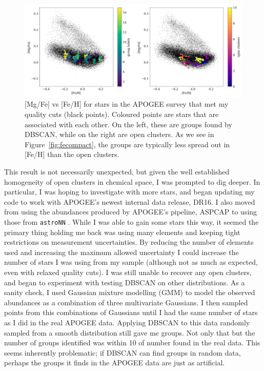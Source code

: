 \documentclass[11pt]{article}
\begin{document}
\begin{figure}
  \begin{center}
    \includegraphics[width=\textwidth]{mgvsfe.png}
  \end{center}
  \caption{[Mg/Fe] vs [Fe/H] for stars in the APOGEE survey that met my quality cuts (black points). Coloured points are stars that are associated with each other. On the left, these are groups found by DBSCAN, while on the right are open clusters. As we see in Figure~\ref{fig:fecompact}, the groups are typically less spread out in [Fe/H] than the open clusters. }
  \label{fig:alphafe}
\end{figure}

This result is not necessarily unexpected, but given the well established homogeneity of open clusters in chemical space, I was prompted to dig deeper. In particular, I was hoping to investigate with more stars, and began updating my code to work with APOGEE's newest internal data release, DR16. I also moved from using the abundances produced by APOGEE's pipeline, ASPCAP \citep{aspcap} to using those from \texttt{astroNN} \citep{astronn}. While I was able to gain some stars this way, it seemed the primary thing holding me back was using many elements and keeping tight restrictions on measurement uncertainties. By reducing the number of elements used and increasing the maximum allowed uncertainty I could increase the number of stars I was using from my sample (although not as much as expected, even with relaxed quality cuts). I was still unable to recover any open clusters, and began to experiment with testing DBSCAN on other distributions. As a sanity check, I used Gaussian mixture modelling (GMM) to model the observed abundances as a combination of three multivariate Gaussians. I then sampled points from this combinations of Gaussians until I had the same number of stars as I did in the real APOGEE data. Applying DBSCAN to this data randomly sampled from a smooth distribution still gave me groups. Not only that but the number of groups identified was within 10 of number found in the real data. This seems inherently problematic; if DBSCAN can find groups in random data, perhaps the groups it finds in the APOGEE data are just as artificial.
\end{document}
